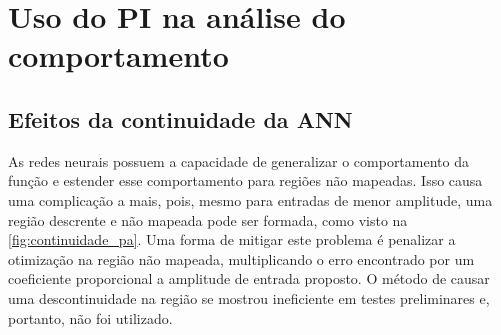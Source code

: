 
\section{Uso do PI na análise do comportamento} \label{sec:estudoi-pi}

\subsection{Efeitos da continuidade da ANN} \label{subsec:estudoi-pi-conti}
As redes neurais possuem a capacidade de generalizar o comportamento da função e estender esse comportamento para regiões não mapeadas. Isso causa uma complicação a mais, pois, mesmo para entradas de menor amplitude, uma região descrente e não mapeada pode ser formada, como visto na \autoref{fig:continuidade_pa}. Uma forma de mitigar este problema é penalizar a otimização na região não mapeada, multiplicando o erro encontrado por um coeficiente proporcional a amplitude de entrada proposto. O método de causar uma descontinuidade na região se mostrou ineficiente em testes preliminares e, portanto, não foi utilizado.


